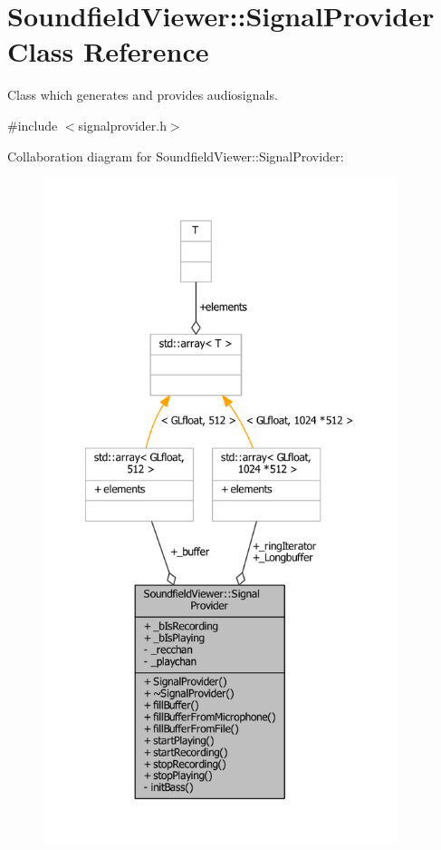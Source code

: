 \section{Soundfield\-Viewer\-:\-:Signal\-Provider Class Reference}
\label{classSoundfieldViewer_1_1SignalProvider}


Class which generates and provides audiosignals.  




{\ttfamily \#include $<$signalprovider.\-h$>$}



Collaboration diagram for Soundfield\-Viewer\-:\-:Signal\-Provider\-:\nopagebreak
\begin{figure}[H]
\begin{center}
\leavevmode
\includegraphics[height=550pt]{d0/d77/classSoundfieldViewer_1_1SignalProvider__coll__graph}
\end{center}
\end{figure}
